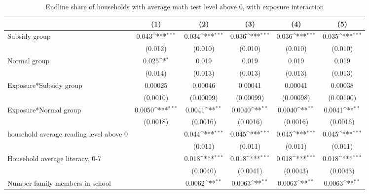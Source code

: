 \begin{table}[htbp]\centering
\def\sym#1{\ifmmode^{#1}\else\(^{#1}\)\fi}
\caption{Endline share of households with average math test level above 0, with exposure interaction}
\begin{tabular*}{1\hsize}{@{\hskip\tabcolsep\extracolsep\fill}l*{5}{c}}
\toprule
                &\multicolumn{1}{c}{(1)}         &\multicolumn{1}{c}{(2)}         &\multicolumn{1}{c}{(3)}         &\multicolumn{1}{c}{(4)}         &\multicolumn{1}{c}{(5)}         \\
\midrule
Subsidy group   &    0.043\sym{***}&    0.034\sym{***}&    0.036\sym{***}&    0.036\sym{***}&    0.035\sym{***}\\
                &  (0.012)         &  (0.010)         &  (0.010)         &  (0.010)         &  (0.010)         \\
Normal group    &    0.025\sym{*}  &    0.019         &    0.019         &    0.019         &    0.019         \\
                &  (0.014)         &  (0.013)         &  (0.013)         &  (0.013)         &  (0.013)         \\
Exposure*Subsidy group&  0.00025         &  0.00046         &  0.00041         &  0.00041         &  0.00038         \\
                & (0.0010)         &(0.00099)         &(0.00099)         &(0.00098)         &(0.00100)         \\
Exposure*Normal group&   0.0050\sym{***}&   0.0041\sym{**} &   0.0040\sym{**} &   0.0040\sym{**} &   0.0041\sym{**} \\
                & (0.0018)         & (0.0016)         & (0.0016)         & (0.0016)         & (0.0016)         \\
household average reading level above 0&                  &    0.044\sym{***}&    0.045\sym{***}&    0.045\sym{***}&    0.045\sym{***}\\
                &                  &  (0.011)         &  (0.011)         &  (0.011)         &  (0.011)         \\
Household average literacy, 0-7&                  &    0.018\sym{***}&    0.018\sym{***}&    0.018\sym{***}&    0.018\sym{***}\\
                &                  & (0.0040)         & (0.0041)         & (0.0043)         & (0.0043)         \\
Number family members in school&                  &   0.0062\sym{**} &   0.0063\sym{**} &   0.0063\sym{**} &   0.0063\sym{**} \\

\end{tabular*}
\end{table}
